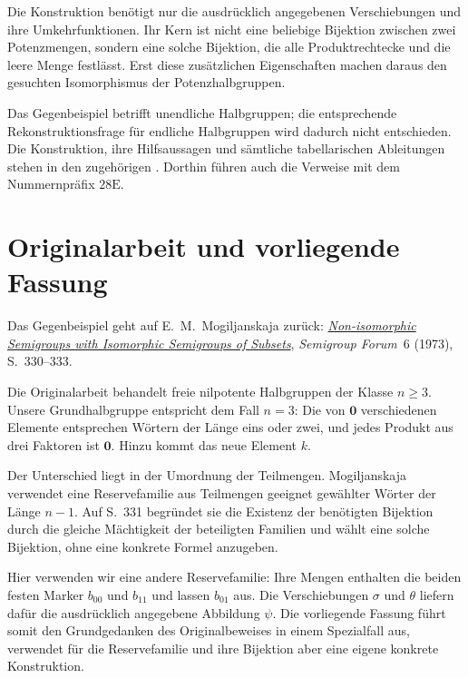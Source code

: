 Die Konstruktion benötigt nur die ausdrücklich angegebenen
Verschiebungen und ihre Umkehrfunktionen. Ihr Kern ist nicht eine
beliebige Bijektion zwischen zwei Potenzmengen, sondern eine solche
Bijektion, die alle Produktrechtecke und die leere Menge festlässt.
Erst diese zusätzlichen Eigenschaften machen daraus den gesuchten
Isomorphismus der Potenzhalbgruppen.

Das Gegenbeispiel betrifft unendliche Halbgruppen; die entsprechende
Rekonstruktionsfrage für endliche Halbgruppen wird dadurch nicht entschieden.
Die Konstruktion, ihre Hilfsaussagen und sämtliche tabellarischen
Ableitungen stehen in den zugehörigen \MogProofsLink{}.
Dorthin führen auch die Verweise mit dem Nummernpräfix \(28\mathrm E\).

\section*{Originalarbeit und vorliegende Fassung}
Das Gegenbeispiel geht auf E.~M.~Mogiljanskaja zurück:
\href{https://doi.org/10.1007/BF02389140}
{\emph{Non-isomorphic Semigroups with Isomorphic Semigroups of Subsets}},
\emph{Semigroup Forum}~6 (1973), S.~330--333.

Die Originalarbeit behandelt freie nilpotente Halbgruppen der Klasse
\(n\geq3\). Unsere Grundhalbgruppe entspricht dem Fall \(n=3\):
Die von \(\mathbf0\) verschiedenen Elemente entsprechen Wörtern
der Länge eins oder zwei, und jedes Produkt aus drei Faktoren ist
\(\mathbf0\). Hinzu kommt das neue Element \(k\).

Der Unterschied liegt in der Umordnung der Teilmengen.
Mogiljanskaja verwendet eine Reservefamilie aus Teilmengen geeignet
gewählter Wörter der Länge \(n-1\). Auf S.~331 begründet sie die
Existenz der benötigten Bijektion durch die gleiche Mächtigkeit der
beteiligten Familien und wählt eine solche Bijektion, ohne eine
konkrete Formel anzugeben.

Hier verwenden wir eine andere Reservefamilie: Ihre Mengen enthalten
die beiden festen Marker \(b_{00}\) und \(b_{11}\) und lassen
\(b_{01}\) aus. Die Verschiebungen \(\sigma\) und \(\theta\)
liefern dafür die ausdrücklich angegebene Abbildung \(\psi\).
Die vorliegende Fassung führt somit den Grundgedanken des
Originalbeweises in einem Spezialfall aus, verwendet für die
Reservefamilie und ihre Bijektion aber eine eigene konkrete
Konstruktion.
